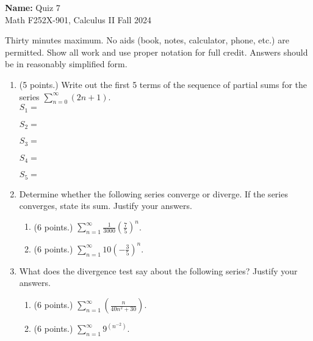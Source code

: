 \documentclass[12pt]{article}
\newcommand{\ds}{\displaystyle}
\newcommand{\points}[1]{(#1 points.)}		%
\begin{document}
\pagestyle{plain}

\noindent \textbf{Name:} \underline{\hspace{15em}}		\hfill	Quiz 7 \\
           Math F252X-901, Calculus II  			\hfill	Fall 2024 	

                \vspace{1cm}
                
Thirty minutes maximum. No aids (book, notes,
calculator, phone, etc.) are permitted. Show all work and use proper
notation for full credit. Answers should be in reasonably simplified
form.

\begin{enumerate}

\item \points{5} Write out the first 5 terms of the sequence of
  partial sums for the series $\ds \sum_{n=0}^{\infty} (2n+1)$. \\
  $S_1 =$ \\
  \vspace{0.02cm}
  
  $S_2 =$ \\
  \vspace{0.02cm}

  $S_3 =$ \\
  \vspace{0.02cm}

  $S_4 =$ \\
  \vspace{0.02cm}

  $S_5 =$
  \vspace{0.02cm}

\item Determine whether the following series converge or diverge. If
  the series converges, state its sum. Justify your answers.
  \begin{enumerate}
  \item \points{6} $\ds \sum_{n=1}^{\infty} \frac{1}{3000} \left( \frac{7}{5} \right)^n$.
    \vfill
    
  \item \points{6} $\ds \sum_{n=1}^{\infty} 10 \left( -\frac{3}{5} \right)^n$.
    \vfill
  \end{enumerate}
  
  \newpage

\item What does the divergence test say about the following series?
  Justify your answers.
  \begin{enumerate}
  \item \points{6} $\ds \sum_{n=1}^{\infty} \left( \frac{n}{40n^2+30} \right)$.
    \vfill
    
  \item \points{6} $\ds \sum_{n=1}^{\infty} 9^{(n^{-2})}$.
    \vfill
  \end{enumerate}
  
  
\end{enumerate}
\end{document}
